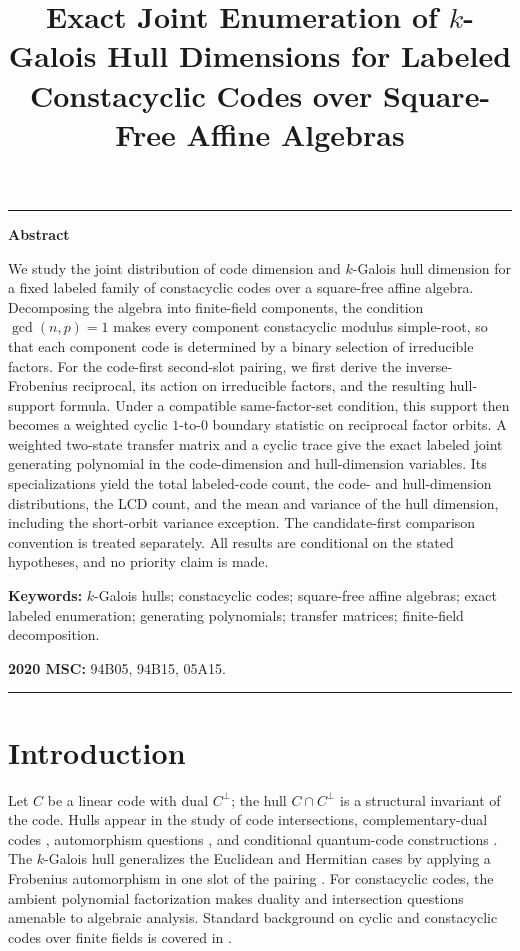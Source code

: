 \documentclass[11pt]{article}
\title{Exact Joint Enumeration of \texorpdfstring{$k$}{k}-Galois Hull Dimensions for Labeled Constacyclic Codes over Square-Free Affine Algebras}
\author{}
\date{}
\theoremstyle{plain}
\theoremstyle{definition}
\theoremstyle{remark}
\begin{document}
\maketitle

\noindent\rule{\linewidth}{0.8pt}

\noindent\textbf{Abstract}

We study the joint distribution of code dimension and $k$-Galois hull dimension for a fixed labeled family of constacyclic codes over a square-free affine algebra. Decomposing the algebra into finite-field components, the condition $\gcd(n,p)=1$ makes every component constacyclic modulus simple-root, so that each component code is determined by a binary selection of irreducible factors. For the code-first second-slot pairing, we first derive the inverse-Frobenius reciprocal, its action on irreducible factors, and the resulting hull-support formula. Under a compatible same-factor-set condition, this support then becomes a weighted cyclic $1$-to-$0$ boundary statistic on reciprocal factor orbits. A weighted two-state transfer matrix and a cyclic trace give the exact labeled joint generating polynomial in the code-dimension and hull-dimension variables. Its specializations yield the total labeled-code count, the code- and hull-dimension distributions, the LCD count, and the mean and variance of the hull dimension, including the short-orbit variance exception. The candidate-first comparison convention is treated separately. All results are conditional on the stated hypotheses, and no priority claim is made.

\noindent\textbf{Keywords:} $k$-Galois hulls; constacyclic codes; square-free affine algebras; exact labeled enumeration; generating polynomials; transfer matrices; finite-field decomposition.

\noindent\textbf{2020 MSC:} 94B05, 94B15, 05A15.

\noindent\rule{\linewidth}{0.8pt}

\section{Introduction}

Let $C$ be a linear code with dual $C^\perp$; the hull $C\cap C^\perp$ is a structural invariant of the code. Hulls appear in the study of code intersections, complementary-dual codes \cite{massey1992,sendrier2004}, automorphism questions \cite{sendrier1997}, and conditional quantum-code constructions \cite{brun2006,wildeBrun2008}. The $k$-Galois hull generalizes the Euclidean and Hermitian cases by applying a Frobenius automorphism in one slot of the pairing \cite{fanZhang2017}. For constacyclic codes, the ambient polynomial factorization makes duality and intersection questions amenable to algebraic analysis. Standard background on cyclic and constacyclic codes over finite fields is covered in \cite{huffmanPless2003}.
\end{document}
